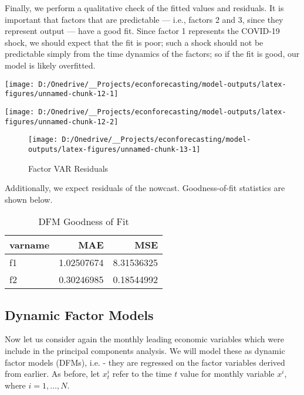 \documentclass[11pt, letterpaper]{article}\usepackage[]{graphicx}\usepackage[]{color}
\begin{document}
Finally, we perform a qualitative check of the fitted values and residuals. It is important that factors that are predictable --- i.e., factors 2 and 3, since they represent output --- have a good fit. Since factor 1 represents the COVID-19 shock, we should expect that the fit is poor; such a shock should not be predictable simply from the time dynamics of the factors; so if the fit is good, our model is likely overfitted.


{\centering \texttt{[image: D:/Onedrive/\_\_Projects/econforecasting/model-outputs/latex-figures/unnamed-chunk-12-1]} 

}




{\centering \texttt{[image: D:/Onedrive/\_\_Projects/econforecasting/model-outputs/latex-figures/unnamed-chunk-12-2]} 

}





\begin{figure}[H]

{\centering \texttt{[image: D:/Onedrive/\_\_Projects/econforecasting/model-outputs/latex-figures/unnamed-chunk-13-1]} 

}

\caption[Factor VAR Residuals]{Factor VAR Residuals}\label{fig:unnamed-chunk-13}
\end{figure}



Additionally, we expect residuals of the nowcast. Goodness-of-fit statistics are shown below.
\begin{table}[H]
\centering
\begingroup\footnotesize
\begin{tabular}{lrr}
  \hline
varname & MAE & MSE \\ 
  \hline
f1 & 1.02507674 & 8.31536325 \\ 
  f2 & 0.30246985 & 0.18544992 \\ 
   \hline
\end{tabular}
\endgroup
\caption{DFM Goodness of Fit} 
\end{table}




\subsection{Dynamic Factor Models}
Now let us consider again the monthly leading economic variables which were include in the principal components analysis. We will model these as dynamic factor models (DFMs), i.e. - they are regressed on the factor variables derived from earlier. As before, let $x^i_t$ refer to the time $t$ value for monthly variable $x^i$, where $i = 1, \dots, N$.
\end{document}
